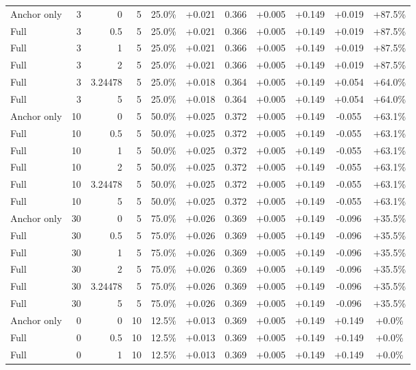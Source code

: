 \begin{table}[htbp]
\begin{tabular}{lrrrccccccc}
Anchor only & 3 & 0 & 5 & 25.0\% & +0.021 & 0.366 & +0.005 & +0.149 & +0.019 & +87.5\% \\
Full & 3 & 0.5 & 5 & 25.0\% & +0.021 & 0.366 & +0.005 & +0.149 & +0.019 & +87.5\% \\
Full & 3 & 1 & 5 & 25.0\% & +0.021 & 0.366 & +0.005 & +0.149 & +0.019 & +87.5\% \\
Full & 3 & 2 & 5 & 25.0\% & +0.021 & 0.366 & +0.005 & +0.149 & +0.019 & +87.5\% \\
Full & 3 & 3.24478 & 5 & 25.0\% & +0.018 & 0.364 & +0.005 & +0.149 & +0.054 & +64.0\% \\
Full & 3 & 5 & 5 & 25.0\% & +0.018 & 0.364 & +0.005 & +0.149 & +0.054 & +64.0\% \\
Anchor only & 10 & 0 & 5 & 50.0\% & +0.025 & 0.372 & +0.005 & +0.149 & -0.055 & +63.1\% \\
Full & 10 & 0.5 & 5 & 50.0\% & +0.025 & 0.372 & +0.005 & +0.149 & -0.055 & +63.1\% \\
Full & 10 & 1 & 5 & 50.0\% & +0.025 & 0.372 & +0.005 & +0.149 & -0.055 & +63.1\% \\
Full & 10 & 2 & 5 & 50.0\% & +0.025 & 0.372 & +0.005 & +0.149 & -0.055 & +63.1\% \\
Full & 10 & 3.24478 & 5 & 50.0\% & +0.025 & 0.372 & +0.005 & +0.149 & -0.055 & +63.1\% \\
Full & 10 & 5 & 5 & 50.0\% & +0.025 & 0.372 & +0.005 & +0.149 & -0.055 & +63.1\% \\
Anchor only & 30 & 0 & 5 & 75.0\% & +0.026 & 0.369 & +0.005 & +0.149 & -0.096 & +35.5\% \\
Full & 30 & 0.5 & 5 & 75.0\% & +0.026 & 0.369 & +0.005 & +0.149 & -0.096 & +35.5\% \\
Full & 30 & 1 & 5 & 75.0\% & +0.026 & 0.369 & +0.005 & +0.149 & -0.096 & +35.5\% \\
Full & 30 & 2 & 5 & 75.0\% & +0.026 & 0.369 & +0.005 & +0.149 & -0.096 & +35.5\% \\
Full & 30 & 3.24478 & 5 & 75.0\% & +0.026 & 0.369 & +0.005 & +0.149 & -0.096 & +35.5\% \\
Full & 30 & 5 & 5 & 75.0\% & +0.026 & 0.369 & +0.005 & +0.149 & -0.096 & +35.5\% \\
Anchor only & 0 & 0 & 10 & 12.5\% & +0.013 & 0.369 & +0.005 & +0.149 & +0.149 & +0.0\% \\
Full & 0 & 0.5 & 10 & 12.5\% & +0.013 & 0.369 & +0.005 & +0.149 & +0.149 & +0.0\% \\
Full & 0 & 1 & 10 & 12.5\% & +0.013 & 0.369 & +0.005 & +0.149 & +0.149 & +0.0\% \\

\end{tabular}
\end{table}
